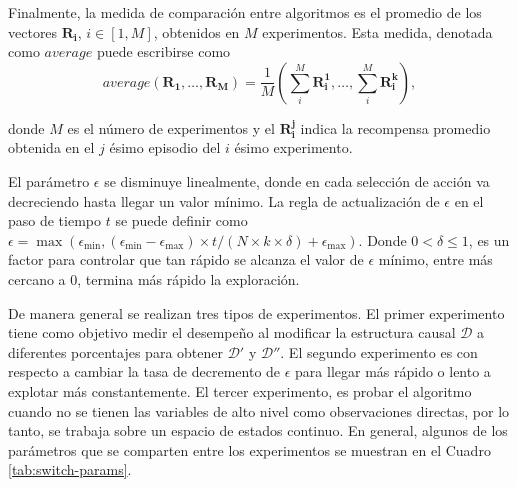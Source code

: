Finalmente, la medida de comparación entre algoritmos es
el promedio de los vectores $\mathbf{R_i}$, $i\in [1, M]$,  obtenidos en $M$ experimentos. Esta medida, denotada como  $average$ puede escribirse como 
\begin{equation}
\label{eq:average}
average(\mathbf{R_1}, \dots, \mathbf{R_M}) = \frac{1}{M}(\sum^M_i \mathbf{R_{i}^1}, \dots, \sum^M_i\mathbf{R_{i}^k}),    
\end{equation}

donde $M$ es el número de experimentos y el $\mathbf{R_i^j}$ indica la recompensa promedio obtenida en el $j$ ésimo episodio del $i$ ésimo experimento.

El parámetro $\epsilon$ se disminuye linealmente, donde
en cada selección de acción va decreciendo hasta llegar
un valor mínimo. La regla de actualización de $\epsilon$ en
el paso de tiempo $t$ se puede definir como $\epsilon = \max(\epsilon_{\min}, (\epsilon_{\min} - \epsilon_{\max}) \times t/ (N \times k \times \delta) + \epsilon_{\max})$. Donde $0 < \delta \leq 1$, es un factor para controlar
que tan rápido se alcanza el valor de $\epsilon$  mínimo, entre más cercano a 0,
termina más rápido la exploración.

De manera general se realizan tres tipos de experimentos. El primer experimento tiene 
como objetivo medir el desempeño al modificar la estructura causal $\mathcal{D}$ a diferentes porcentajes para obtener $\mathcal{D'}$ y $\mathcal{D}''$. El segundo experimento es con respecto a cambiar la tasa de decremento
de $\epsilon$ para llegar más rápido o lento a explotar 
más constantemente. El tercer experimento, es probar
el algoritmo cuando no se tienen las variables
de alto nivel como observaciones directas, por lo tanto,
se trabaja sobre un espacio de estados continuo. En general,
algunos de los parámetros que se comparten entre los experimentos se muestran en el Cuadro \ref{tab:switch-params}.


